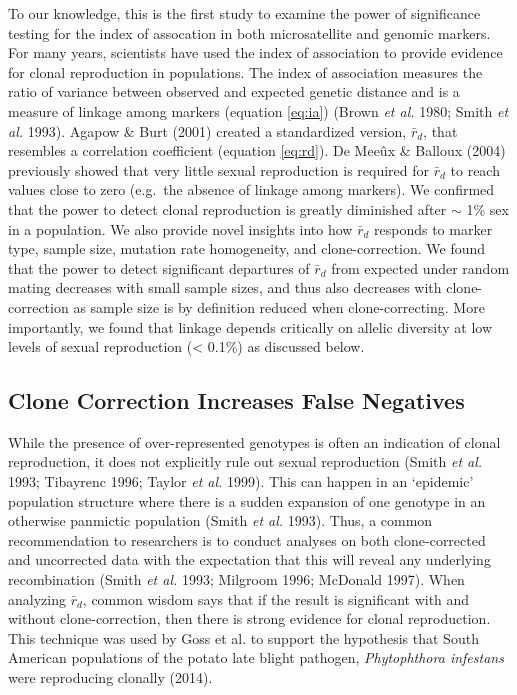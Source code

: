\documentclass[]{article}
\theoremstyle{definition}
\theoremstyle{definition}
\theoremstyle{definition}
\theoremstyle{remark}
\begin{document}
To our knowledge, this is the first study to examine the power of
significance testing for the index of assocation in both microsatellite
and genomic markers. For many years, scientists have used the index of
association to provide evidence for clonal reproduction in populations.
The index of association measures the ratio of variance between observed
and expected genetic distance and is a measure of linkage among markers
(equation \eqref{eq:ia}) (Brown \emph{et al.} 1980; Smith \emph{et al.}
1993). Agapow \& Burt (2001) created a standardized version,
\(\bar{r}_d\), that resembles a correlation coefficient (equation
\eqref{eq:rd}). De Meeûx \& Balloux (2004) previously showed that very
little sexual reproduction is required for \(\bar{r}_d\) to reach values
close to zero (e.g.~the absence of linkage among markers). We confirmed
that the power to detect clonal reproduction is greatly diminished after
\(\sim\) 1\% sex in a population. We also provide novel insights into
how \(\bar{r}_d\) responds to marker type, sample size, mutation rate
homogeneity, and clone-correction. We found that the power to detect
significant departures of \(\bar{r}_d\) from expected under random
mating decreases with small sample sizes, and thus also decreases with
clone-correction as sample size is by definition reduced when
clone-correcting. More importantly, we found that linkage depends
critically on allelic diversity at low levels of sexual reproduction
(\textless{} 0.1\%) as discussed below.

\subsection{Clone Correction Increases False
Negatives}\label{clone-correction-increases-false-negatives}

While the presence of over-represented genotypes is often an indication
of clonal reproduction, it does not explicitly rule out sexual
reproduction (Smith \emph{et al.} 1993; Tibayrenc 1996; Taylor \emph{et
al.} 1999). This can happen in an `epidemic' population structure where
there is a sudden expansion of one genotype in an otherwise panmictic
population (Smith \emph{et al.} 1993). Thus, a common recommendation to
researchers is to conduct analyses on both clone-corrected and
uncorrected data with the expectation that this will reveal any
underlying recombination (Smith \emph{et al.} 1993; Milgroom 1996;
McDonald 1997). When analyzing \(\bar{r}_d\), common wisdom says that if
the result is significant with and without clone-correction, then there
is strong evidence for clonal reproduction. This technique was used by
Goss et al. to support the hypothesis that South American populations of
the potato late blight pathogen, \emph{Phytophthora infestans} were
reproducing clonally (2014).
\end{document}
